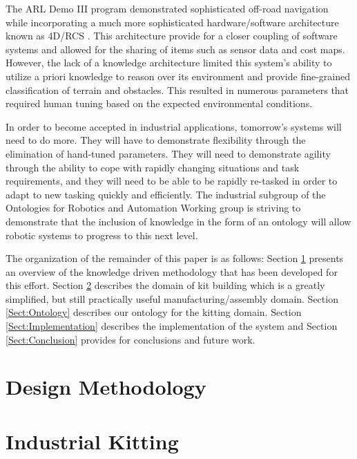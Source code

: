 \documentclass[preprint,12pt]{elsarticle}
\begin{document}
The ARL Demo III program demonstrated sophisticated off-road navigation while incorporating a much more sophisticated
hardware/software architecture known as 4D/RCS \cite{Albus2000}. This
architecture provide for a closer coupling of software systems and allowed for the sharing of items such as sensor data and cost maps.
However, the lack of a knowledge architecture limited this system\rq{}s ability to utilize a priori knowledge to reason over its environment
and provide fine-grained classification of terrain and obstacles. This resulted in numerous parameters that required human tuning based on
the expected environmental conditions.

In order to become accepted in industrial applications, tomorrow\rq{}s systems will need to do more. They will have to demonstrate flexibility through the
elimination of hand-tuned parameters. They will need to demonstrate agility through the ability to cope with rapidly changing situations and task requirements,
and they will need to be able to be rapidly re-tasked in order to adapt to new tasking quickly and efficiently. The  industrial subgroup of the
Ontologies for Robotics and Automation Working group is striving to demonstrate that the inclusion of knowledge in the form of an ontology
will allow robotic systems to progress to this next level.

The organization of the remainder of this paper is as follows: Section \ref{Sect:Methodology} presents an overview of the knowledge driven methodology that
has been developed for this effort. Section \ref{Sect:Kitting} describes the domain of kit building
which is a greatly simplified, but still practically useful manufacturing/assembly domain. Section \ref{Sect:Ontology} describes our ontology for the kitting
domain. Section \ref{Sect:Implementation} describes the implementation of the system and Section \ref{Sect:Conclusion} provides for conclusions and
future work.


\section{Design Methodology}
\label{Sect:Methodology}


\section{Industrial Kitting}
\label{Sect:Kitting}


\end{document}
